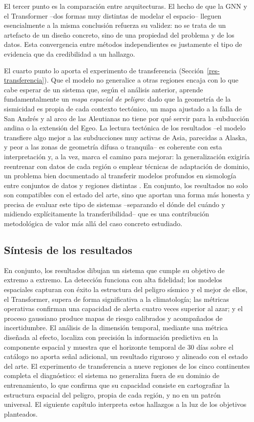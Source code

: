 El tercer punto es la comparación entre arquitecturas. El hecho de que la GNN y el Transformer
--dos formas muy distintas de modelar el espacio-- lleguen esencialmente a la misma conclusión
refuerza su validez: no se trata de un artefacto de un diseño concreto, sino de una propiedad del
problema y de los datos. Esta convergencia entre métodos independientes es justamente el tipo de
evidencia que da credibilidad a un hallazgo.

El cuarto punto lo aporta el experimento de transferencia (Sección~\ref{res-transferencia}). Que
el modelo no generalice a otras regiones encaja con lo que cabe esperar de un sistema que, según
el análisis anterior, aprende fundamentalmente un \emph{mapa espacial de peligro}: dado que la
geometría de la sismicidad es propia de cada contexto tectónico, un mapa ajustado a la falla de
San Andrés y al arco de las Aleutianas no tiene por qué servir para la subducción andina o la
extensión del Egeo. La lectura tectónica de los resultados --el modelo transfiere algo mejor a las
subducciones muy activas de Asia, parecidas a Alaska, y peor a las zonas de geometría difusa o
tranquila-- es coherente con esta interpretación y, a la vez, marca el camino para mejorar: la
generalización exigiría reentrenar con datos de cada región o emplear técnicas de adaptación de
dominio, un problema bien documentado al transferir modelos profundos en sismología entre
conjuntos de datos y regiones distintas \citep{munchmeyer2022picker}. En conjunto, los resultados no solo son compatibles con el estado del arte, sino que
aportan una forma más honesta y precisa de evaluar este tipo de sistemas --separando el dónde del
cuándo y midiendo explícitamente la transferibilidad-- que es una contribución metodológica de
valor más allá del caso concreto estudiado.

\subsection{Síntesis de los resultados}
\label{res-sintesis}

En conjunto, los resultados dibujan un sistema que cumple su objetivo de extremo a extremo. La
detección funciona con alta fidelidad; los modelos espaciales capturan con éxito la estructura del
peligro sísmico y el mejor de ellos, el Transformer, supera de forma significativa a la
climatología; las métricas operativas confirman una capacidad de alerta cuatro veces superior al
azar; y el proceso gaussiano produce mapas de riesgo calibrados y acompañados de incertidumbre. El
análisis de la dimensión temporal, mediante una métrica diseñada al efecto, localiza con precisión
la información predictiva en la componente espacial y muestra que el horizonte temporal de 30 días
sobre el catálogo no aporta señal adicional, un resultado riguroso y alineado con el estado del
arte. El experimento de transferencia a nueve regiones de los cinco continentes completa el
diagnóstico: el sistema no generaliza fuera de su dominio de entrenamiento, lo que confirma que su
capacidad consiste en cartografiar la estructura espacial del peligro, propia de cada región, y no
en un patrón universal. El siguiente capítulo interpreta estos hallazgos a la luz de los objetivos
planteados.
